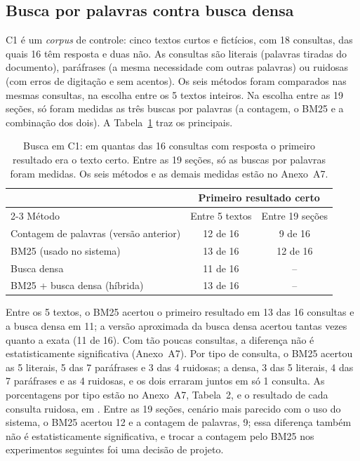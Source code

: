\documentclass[12pt]{article}
\newcommand{\fonte}{\par\vspace{3pt}{\footnotesize Fonte: o autor.}\par}
\begin{document}
\subsection{Busca por palavras contra busca densa}
\label{sec:res-recuperacao}

C1 é um \emph{corpus} de controle: cinco textos curtos e fictícios, com 18 consultas, das quais 16 têm resposta e duas não. As consultas são literais (palavras tiradas do documento), paráfrases (a mesma necessidade com outras palavras) ou ruidosas (com erros de digitação e sem acentos). Os seis métodos foram comparados nas mesmas consultas, na escolha entre os 5 textos inteiros. Na escolha entre as 19 seções, só foram medidas as três buscas por palavras (a contagem, o BM25 e a combinação dos dois). A Tabela~\ref{tab:retrieval-summary} traz os principais.

\begin{table}[!htbp]
\centering
\caption{Busca em C1: em quantas das 16 consultas com resposta o primeiro resultado era o texto certo. Entre as 19 seções, só as buscas por palavras foram medidas. Os seis métodos e as demais medidas estão no Anexo~A7.}
\label{tab:retrieval-summary}
\begin{tabular}{lcc}
\toprule
 & \multicolumn{2}{c}{Primeiro resultado certo} \\
\cmidrule(lr){2-3}
Método & Entre 5 textos & Entre 19 seções \\
\midrule
Contagem de palavras (versão anterior) & 12 de 16 & 9 de 16 \\
BM25 (usado no sistema) & 13 de 16 & 12 de 16 \\
Busca densa & 11 de 16 & -- \\
BM25 + busca densa (híbrida) & 13 de 16 & -- \\
\bottomrule
\end{tabular}
\fonte
\end{table}

Entre os 5 textos, o BM25 acertou o primeiro resultado em 13 das 16 consultas e a busca densa em 11; a versão aproximada da busca densa acertou tantas vezes quanto a exata (11 de 16). Com tão poucas consultas, a diferença não é estatisticamente significativa (Anexo~A7). Por tipo de consulta, o BM25 acertou as 5 literais, 5 das 7 paráfrases e 3 das 4 ruidosas; a densa, 3 das 5 literais, 4 das 7 paráfrases e as 4 ruidosas, e os dois erraram juntos em só 1 consulta. As porcentagens por tipo estão no Anexo~A7, Tabela~2, e o resultado de cada consulta ruidosa, em . Entre as 19 seções, cenário mais parecido com o uso do sistema, o BM25 acertou 12 e a contagem de palavras, 9; essa diferença também não é estatisticamente significativa, e trocar a contagem pelo BM25 nos experimentos seguintes foi uma decisão de projeto.
\end{document}
